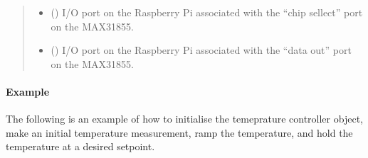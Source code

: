\documentclass[letterpaper,10pt,english]{sphinxmanual}
\begin{document}
\begin{fulllineitems}
\begin{quote}
\begin{description}
\begin{itemize}
\item {} 
 (\sphinxstyleliteralemphasis{\sphinxupquote{, }}) \textendash{} I/O port on the Raspberry Pi associated with the “chip sellect” port
on the MAX31855.

\item {} 
 (\sphinxstyleliteralemphasis{\sphinxupquote{, }}) \textendash{} I/O port on the Raspberry Pi associated with the “data out” port on the
MAX31855.

\end{itemize}

\end{description}\end{quote}
\paragraph{Example}

The following is an example of how to initialise the temeprature controller
object, make an initial temperature measurement, ramp the temperature,
and hold the temperature at a desired setpoint.

%
\begin{sphinxVerbatim}[commandchars=\\\{\}]
   
   
  
    
   
\end{sphinxVerbatim}


\end{fulllineitems}
\end{document}
